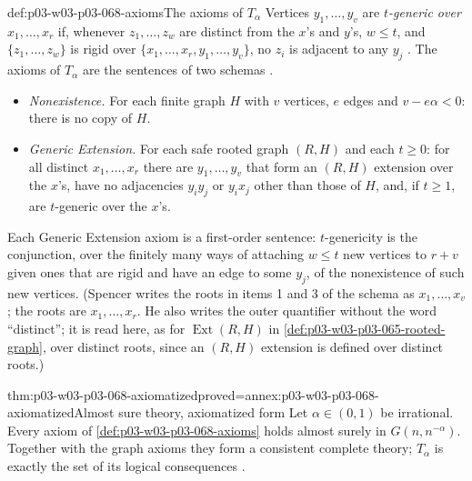 \begin{hbdefinition}{def:p03-w03-p03-068-axioms}{The axioms of \(T_\alpha\)}
Vertices \(y_1,\ldots,y_v\) are \emph{\(t\)-generic over} \(x_1,\ldots,x_r\)
if, whenever \(z_1,\ldots,z_w\) are distinct from the \(x\)'s and \(y\)'s,
\(w\leq t\), and \(\{z_1,\ldots,z_w\}\) is rigid over
\(\{x_1,\ldots,x_r,y_1,\ldots,y_v\}\), no \(z_i\) is adjacent to any \(y_j\)
\cite[p.~10]{Spencer2007LogicRandomStructuresAuthor}.  The axioms of \(T_\alpha\) are the
sentences of two schemas \cite[p.~10]{Spencer2007LogicRandomStructuresAuthor}.
\begin{itemize}
\item \emph{Nonexistence.}  For each finite graph \(H\) with \(v\) vertices,
\(e\) edges and \(v-e\alpha<0\): there is no copy of \(H\).
\item \emph{Generic Extension.}  For each safe rooted graph \((R,H)\) and each
\(t\geq0\): for all distinct \(x_1,\ldots,x_r\) there are \(y_1,\ldots,y_v\)
that form an \((R,H)\) extension over the \(x\)'s, have no adjacencies
\(y_iy_j\) or \(y_ix_j\) other than those of \(H\), and, if \(t\geq1\), are
\(t\)-generic over the \(x\)'s.
\end{itemize}
Each Generic Extension axiom is a first-order sentence: \(t\)-genericity is
the conjunction, over the finitely many ways of attaching \(w\leq t\) new
vertices to \(r+v\) given ones that are rigid and have an edge to some
\(y_j\), of the nonexistence of such new vertices.  (Spencer writes the
roots in items 1 and 3 of the schema as \(x_1,\ldots,x_v\); the roots are
\(x_1,\ldots,x_r\).  He also writes the outer quantifier without the word
``distinct''; it is read here, as for \(\operatorname{Ext}(R,H)\) in
\cref{def:p03-w03-p03-065-rooted-graph}, over distinct roots, since an
\((R,H)\) extension is defined over distinct roots.)
\end{hbdefinition}

\begin{hbtheorem}{thm:p03-w03-p03-068-axiomatized}{proved=annex:p03-w03-p03-068-axiomatized}{Almost sure theory, axiomatized form}
Let \(\alpha\in(0,1)\) be irrational.  Every axiom of
\cref{def:p03-w03-p03-068-axioms} holds almost surely in
\(G(n,n^{-\alpha})\).  Together with the graph axioms they form a
consistent complete theory; \(T_\alpha\) is exactly the set of its logical
consequences
\cite[pp.~10--12]{Spencer2007LogicRandomStructuresAuthor}.
\end{hbtheorem}

